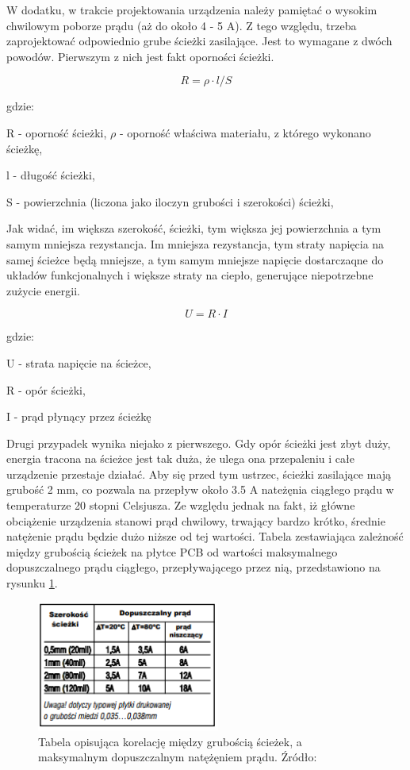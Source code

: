 W dodatku, w trakcie projektowania urządzenia należy pamiętać o wysokim chwilowym poborze prądu (aż do około 4 - 5 A). Z tego względu, trzeba zaprojektować odpowiednio grube ścieżki zasilające. Jest to wymagane z dwóch powodów. Pierwszym z nich jest fakt oporności ścieżki.

\begin{equation}
 R = \rho \cdot l / S 
 \label{eq_pcb_wire_resistance}
\end{equation}

gdzie:

R - oporność ścieżki,
$\rho$ - oporność właściwa materiału, z którego wykonano ścieżkę,

l - długość ścieżki,

S - powierzchnia (liczona jako iloczyn grubości i szerokości) ścieżki,

Jak widać, im większa szerokość, ścieżki, tym większa jej powierzchnia a tym samym mniejsza rezystancja. Im mniejsza rezystancja, tym straty napięcia na samej ścieżce będą mniejsze, a tym samym mniejsze napięcie dostarczaqne do układów funkcjonalnych i większe straty na ciepło, generujące niepotrzebne zużycie energii.

\begin{equation}
 U = R \cdot I
 \label{eq_voltage_drop_on_pcb_wire} 
\end{equation}

 gdzie:
 
 U - strata napięcie na ścieżce,
 
 R - opór ścieżki,
 
 I - prąd płynący przez ścieżkę
 
\clearpage
Drugi przypadek wynika niejako z pierwszego. Gdy opór ścieżki jest zbyt duży, energia tracona na ścieżce jest tak duża, że ulega ona przepaleniu i całe urządzenie przestaje działać. Aby się przed tym ustrzec, ścieżki zasilające mają grubość 2 mm, co pozwala na przepływ około 3.5 A nateżęnia ciągłego prądu w temperaturze 20 stopni Celsjusza. Ze względu jednak na fakt, iż główne obciążenie urządzenia stanowi prąd chwilowy, trwający bardzo krótko, średnie natężenie prądu będzie dużo niższe od tej wartości. Tabela zestawiająca zależność między grubością ścieżek na płytce PCB od wartości maksymalnego dopuszczalnego prądu ciągłego, przepływającego przez nią, przedstawiono na rysunku \ref{fig:image_pcb_wire_thickness}.

\begin{figure}[H]
	\centering
	\includegraphics[width=6cm]{img/board_layouts/pcb_wire_thickness.png}
	\caption{Tabela opisująca korelację między grubością ścieżek, a maksymalnym dopuszczalnym natężęniem prądu. Źródło: \cite{pcb_wire_thickness}}
	\label{fig:image_pcb_wire_thickness}
\end{figure}
 

